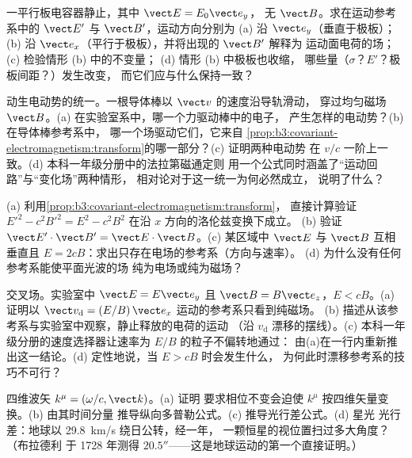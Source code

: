 \begin{exercise}[$\star$]\label{exo:b3:covariant-electromagnetism:4}
一平行板电容器静止，其中 $\vect E = E_0\vect e_y$，
无 $\vect B$。求在运动参考系中的 $\vect E'$ 与 $\vect B'$，运动方向分别为 (a)
沿 $\vect e_y$（垂直于极板）；(b) 沿 $\vect
e_x$（平行于极板），并将出现的 $\vect B'$ 解释为
运动面电荷的场；(c) 检验情形 (b) 中的不变量；
(d) 情形 (b) 中极板也收缩，
哪些量（$\sigma$？$E'$？极板间距？）发生改变，
而它们应与什么保持一致？
\end{exercise}

\begin{exercise}[$\star\star$]\label{exo:b3:covariant-electromagnetism:5}
动生电动势的统一。一根导体棒以 $\vect v$ 的速度沿导轨滑动，
穿过均匀磁场 $\vect B$。(a) 在实验室系中，哪一个力驱动棒中的电子，
产生怎样的电动势？(b) 在导体棒参考系中，
哪一个场驱动它们，它来自
\cref{prop:b3:covariant-electromagnetism:transform}的哪一部分？(c) 证明两种电动势
在 $v/c$ 一阶上一致。(d) 本科一年级分册中的法拉第磁通定则
用一个公式同时涵盖了“运动回路”与“变化场”两种情形，
相对论对于这一统一为何必然成立，
说明了什么？
\end{exercise}

\begin{exercise}[$\star\star$]\label{exo:b3:covariant-electromagnetism:6}
(a) 利用\cref{prop:b3:covariant-electromagnetism:transform}，
直接计算验证 $E'^2 - c^2B'^2 = E^2 - c^2B^2$ 在沿 $x$ 方向的洛伦兹变换下成立。
(b) 验证 $\vect E'\cdot\vect B' = \vect
E\cdot\vect B$。(c) 某区域中 $\vect E$ 与 $\vect B$
互相垂直且 $E = 2cB$：求出只存在电场的参考系（方向与速率）。
(d) 为什么没有任何参考系能使平面光波的场
纯为电场或纯为磁场？
\end{exercise}

\begin{exercise}[$\star\star$]\label{exo:b3:covariant-electromagnetism:7}
交叉场。实验室中 $\vect E = E\vect e_y$ 且 $\vect B =
B\vect e_z$，$E < cB$。(a) 证明以
$\vect v_{\text{d}} = (E/B)\,\vect e_x$ 运动的参考系只看到纯磁场。
(b) 描述从该参考系与实验室中观察，静止释放的电荷的运动
（沿 $v_{\text{d}}$ 漂移的摆线）。(c)
本科一年级分册的速度选择器让速率为 $E/B$ 的粒子不偏转地通过：
由(a)在一行内重新推出这一结论。(d) 定性地说，当 $E > cB$
时会发生什么，
为何此时漂移参考系的技巧不可行？
\end{exercise}

\begin{exercise}[$\star\star$]\label{exo:b3:covariant-electromagnetism:8}
四维波矢 $k^\mu = (\omega/c, \vect k)$。(a) 证明
要求相位不变会迫使 $k^\mu$ 按四维矢量变换。(b) 由其时间分量
推导纵向多普勒公式。(c) 推导光行差公式。(d) 星光
光行差：地球以 \qty{29.8}{km/s} 绕日公转，经一年，
一颗恒星的视位置扫过多大角度？（布拉德利
于 1728 年测得
$20.5''$——这是地球运动的第一个直接证明。）
\end{exercise}

